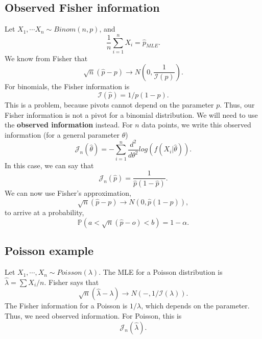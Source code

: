 \documentclass[titlepage, 12pt, leqno]{article}
\begin{document}
\subsection{Observed Fisher information}
Let $X_{1}, \cdots X_{n} \sim Binom(n,p)$, and
\[
\frac{1}{n} \sum_{i=1}^{n}X_{i} = \hat p_{MLE}.
\]
We know from Fisher that
\[
\sqrt{n}(\hat p -p) \rightarrow N\left(0, \frac{1}{\mathcal{I}(p)}\right).
\]
For binomials, the Fisher information is
\[
\mathcal{I}(\hat p) = 1/p(1-p).
\]
This is a problem, because pivots cannot depend on the parameter $p$. Thus,
our Fisher information is not a pivot for a binomial distribution. We will 
need to use the \textbf{observed information} instead. For $n$ data points, we
write this observed information (for a general parameter $\theta$)
\[
\mathcal{J}_{n}(\hat \theta) = -\sum_{i=1}^{n}\frac{d^{2}}{d \theta^{2}}
log(f( X_{i}| \hat \theta)).
\]
In this case, we can say that
\[
    \mathcal{J}_{n}(\hat p) = \frac{1}{\hat p(1-\hat p)}.
\]
We can now use Fisher's approximation,
\[
\sqrt{n}(\hat p - p) \rightarrow N(0, \hat p(1-\hat p)),
\]
to arrive at a probability,
\[
\mathbb{P}(a < \sqrt{n}(\hat p - o) < b) = 1 - \alpha.
\]
\subsection{Poisson example}
Let $X_{1}, \cdots , X_{n} \sim Poisson(\lambda)$. The MLE for a Poisson
distribution is $\hat \lambda = \sum X_{i}/ n$. Fisher says that
\[
\sqrt{n}(\hat \lambda - \lambda) \rightarrow N(-, 1 / \mathcal{I}(\lambda)).
\]
The Fisher information for a Poisson is $1/\lambda$, which depends on the
parameter. Thus, we need observed information. For Poisson, this is
\[
\mathcal{J}_{n}(\hat \lambda).
\]
\end{document}
